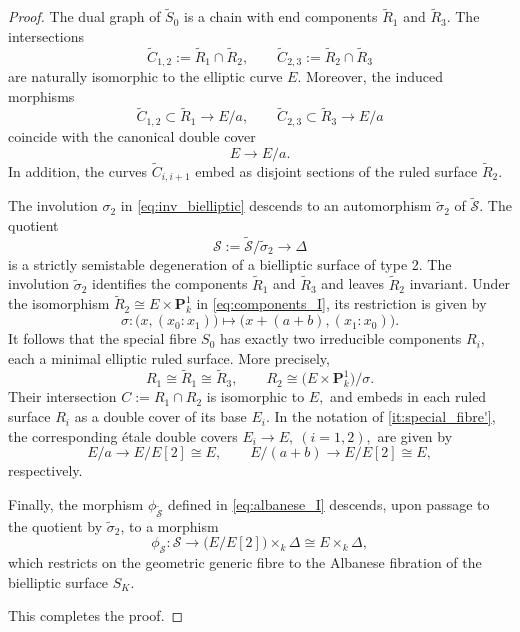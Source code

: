\documentclass[11pt,letterpaper]{amsart}
\newcommand{\ca}[1]{{\mathcal{#1}}}
\numberwithin{equation}{section}
\theoremstyle{definition}
\theoremstyle{remark}
\newcommand{\bbP}{\mathbf{P}}
\begin{document}
\begin{proof}
The dual graph of $\widetilde{S}_{0}$ is a chain with end components $\widetilde{R}_{1}$ and $ \widetilde{R}_{3}$. The intersections 
\begin{equation*}
    \widetilde{C}_{1,2}:= \widetilde{R}_{1}\cap \widetilde{R}_{2},\qquad \widetilde{C}_{2,3}:=\widetilde{R}_{2}\cap \widetilde{R}_{3}
\end{equation*}
are naturally isomorphic to the elliptic curve $E$. Moreover, the induced morphisms $$ \widetilde{C}_{1,2}\subset \widetilde{R}_{1} \longrightarrow E/a,\qquad \widetilde{C}_{2,3}\subset \widetilde{R}_{3} \longrightarrow E/a$$ coincide with the canonical double cover $$E\longrightarrow E/a.$$ In addition, the curves $\widetilde{C}_{i,i+1}$ embed as disjoint sections of the ruled surface $\widetilde{R}_{2}$.\par
The involution $\sigma_{2}$ in \eqref{eq:inv_bielliptic} descends to an automorphism $\widetilde{\sigma}_{2}$ of $\widetilde{\ca S}$. The quotient \begin{equation}\label{eq:deg_II}
    \ca S:=\widetilde{\ca S}/\widetilde{\sigma}_{2}\longrightarrow\Delta
\end{equation}
is a strictly semistable degeneration of a bielliptic surface of type 2. The involution $\widetilde{\sigma}_{2}$ identifies the components $\widetilde{R}_{1}$ and $\widetilde{R}_{3}$ and leaves $\widetilde{R}_{2}$ invariant. Under the isomorphism $\widetilde{R}_{2}\cong E \times \bbP^1_k$ in \eqref{eq:components_I}, its restriction is given by $$\sigma\colon\bigl(x,(x_{0}:x_{1})\bigr)\longmapsto \bigl(x+(a+b),(x_{1}:x_{0})\bigr).$$
It follows that the special fibre $S_{0}$ has exactly two irreducible components $R_{i},$ each a minimal elliptic ruled surface. More precisely, 
\begin{equation}\label{eq:components_II}
R_{1}\cong \widetilde{R}_{1}\cong \widetilde{R}_{3},\qquad R_{2}\cong \bigl(E\times\bbP^1_{k}\bigr)/\sigma.
\end{equation}
Their intersection $C:=R_{1}\cap R_{2}$ is isomorphic to $E,$ and embeds in each ruled surface $R_{i}$ as a double cover of its base $E_{i}$. In the notation of \eqref{it:special_fibre'}, the corresponding \'etale double covers $E_{i}\to E,\ (i=1,2),$ are given by \begin{equation}\label{eq:double_covers}
    E/a\longrightarrow E/E[2]\cong E,\qquad E/(a+b)\longrightarrow E/E[2]\cong E,
\end{equation}
respectively.\par
Finally, the morphism $\phi_{\widetilde{\ca S}}$ defined in \eqref{eq:albanese_I} descends, upon passage to the quotient by $\widetilde{\sigma}_{2}$, to a morphism 
\begin{equation}\label{eq:albanese_II}
\phi_{\ca S}\colon \ca S\longrightarrow \bigl(E/E[2]\bigr)\times_{k}\Delta\cong E\times_{k}\Delta,
\end{equation}
which restricts on the geometric generic fibre to the Albanese fibration of the bielliptic surface $S_{K}$.\par
This completes the proof.
\end{proof}
\end{document}
